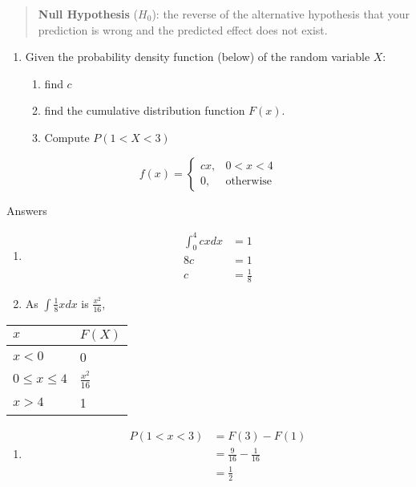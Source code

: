 \documentclass[]{article}
\providecommand{\tightlist}{%
  \setlength{\itemsep}{0pt}\setlength{\parskip}{0pt}}
\begin{document}
\begin{quote}
\textbf{Null Hypothesis} (\(H_0\)): the reverse of the alternative
hypothesis that your prediction is wrong and the predicted effect does
not exist.
\end{quote}

\newpage

\begin{enumerate}
\def\labelenumi{\arabic{enumi}.}
\item
  Given the probability density function (below) of the random variable
  \(X\):

  \begin{enumerate}
  \def\labelenumii{\alph{enumii}.}
  \tightlist
  \item
    find \(c\)
  \item
    find the cumulative distribution function \(F(x)\).
  \item
    Compute \(P(1 < X < 3)\)
  \end{enumerate}
\end{enumerate}

\[f(x) = \begin{cases} 
  cx, & 0 < x < 4 \\
  0, & \textrm{otherwise}
  \end{cases}\]

Answers

\begin{enumerate}
\def\labelenumi{\alph{enumi})}
\item
  \[
  \begin{aligned}
  \int_{0}^{4} cx dx &= 1 \\
    8c &= 1 \\
    c &= \frac{1}{8}
  \end{aligned}
  \]
\item
  As \(\int \frac{1}{8} x dx\) is \(\frac{x^{2}}{16}\),
\end{enumerate}

\begin{longtable}[]{@{}ll@{}}
\toprule
\(x\) & \(F(X)\)\tabularnewline
\midrule
\endhead
\(x<0\) & 0\tabularnewline
\(0 \leq x \leq 4\) & \(\frac{x^{2}}{16}\)\tabularnewline
\(x>4\) & 1\tabularnewline
\bottomrule
\end{longtable}

\begin{enumerate}
\def\labelenumi{\alph{enumi})}
\setcounter{enumi}{2}
\tightlist
\item
  \[
  \begin{aligned}
  P(1 < x < 3) &= F(3) - F(1) \\
    &= \frac{9}{16} - \frac{1}{16} \\
    &= \frac{1}{2}
  \end{aligned}
  \]
\end{enumerate}
\end{document}
